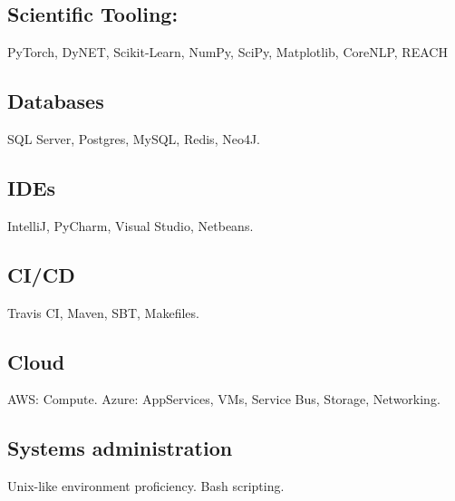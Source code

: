 \documentclass[letterpaper]{article}
\renewenvironment{itemize}{
  \begin{list}{}{
    \setlength{\leftmargin}{1.5em}
  }
}{
  \end{list}
}
\begin{document}
\subsection*{Scientific Tooling:}
\begin{itemize}
	\item PyTorch, DyNET, Scikit-Learn, NumPy, SciPy, Matplotlib, CoreNLP, REACH
\end{itemize}
\vspace{-2em}
\subsection*{Databases}
\begin{itemize}
	\item SQL Server, Postgres, MySQL, Redis, Neo4J.
\end{itemize}
\vspace{-2em}
\subsection*{IDEs}
\begin{itemize}
	\item IntelliJ, PyCharm, Visual Studio, Netbeans.
\end{itemize}
\vspace{-2em}
\subsection*{CI/CD}
\begin{itemize}
	\item Travis CI, Maven, SBT, Makefiles.
\end{itemize}
\vspace{-2em}
\subsection*{Cloud}
\begin{itemize}
	\item AWS: Compute. Azure: AppServices, VMs, Service Bus, Storage, Networking.
\end{itemize}
\vspace{-2em}
\subsection*{Systems administration}
\begin{itemize}
	\item Unix-like environment proficiency. Bash scripting.
\end{itemize}
\end{document}
